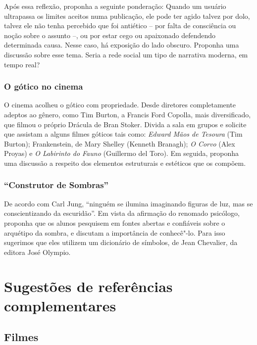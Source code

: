 \documentclass[12pt]{extarticle}
\begin{document}
Após essa reflexão, proponha a seguinte
ponderação: Quando um usuário ultrapassa os limites aceitos numa
publicação, ele pode ter agido talvez por dolo, talvez ele não tenha
percebido que foi antiético -- por falta de consciência ou noção sobre
o assunto --, ou por estar cego ou apaixonado defendendo determinada
causa. Nesse caso, há exposição do lado obscuro. Proponha uma
discussão sobre esse tema. Seria a rede social um tipo de narrativa
moderna, em tempo real?


\subsubsection{O gótico no cinema}
O cinema acolheu o gótico com propriedade. Desde diretores
completamente adeptos ao gênero, como Tim Burton, a Francis Ford
Copolla, mais diversificado, que filmou o próprio Drácula de Bran
Stoker. Divida a sala em grupos e solicite que assistam a alguns filmes góticos
tais como: \emph{Edward Mãos de Tesoura} (Tim Burton); {Frankenstein}, de Mary
Shelley (Kenneth Branagh); \emph{O Corvo} (Alex Proyas) e \emph{O Labirinto do
Fauno} (Guillermo del Toro). Em seguida, proponha uma discussão a
respeito dos elementos estruturais e estéticos que os compõem.

\subsubsection{``Construtor de Sombras''}
De acordo com Carl Jung, ``ninguém se ilumina imaginando figuras de
luz, mas se conscientizando da escuridão''. Em vista da afirmação do
renomado psicólogo, proponha que os alunos pesquisem em fontes 
abertas e confiáveis sobre o arquétipo
da sombra, e discutam a importância de conhecê"-lo. 
Para isso sugerimos que eles utilizem um dicionário de símbolos, de 
Jean Chevalier, da editora José Olympio. 


\section{Sugestões de referências complementares}

\subsection{Filmes}
\end{document}
